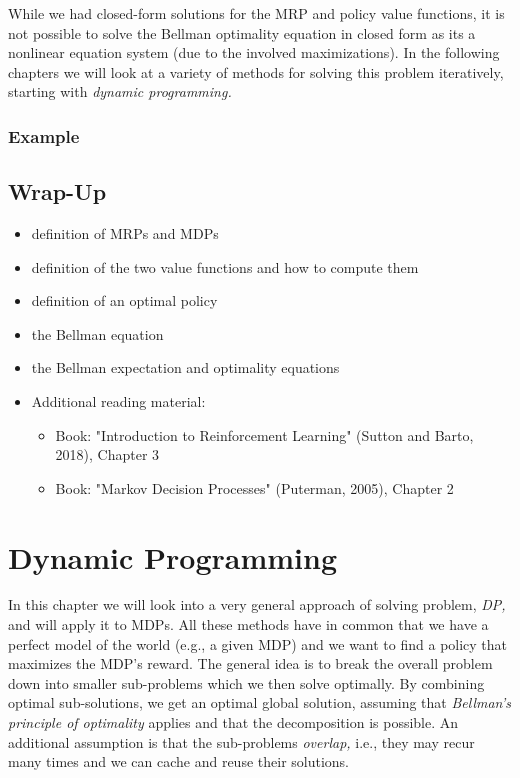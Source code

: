 				While we had closed-form solutions for the \ac{MRP} and policy value functions, it is not possible to solve the Bellman optimality equation in closed form as its a nonlinear equation system (due to the involved maximizations). In the following chapters we will look at a variety of methods for solving this problem iteratively, starting with \emph{dynamic programming.}

		\subsection{Example}

	\section{Wrap-Up}
		\begin{itemize}
			\item definition of \aclp{MRP} and \aclp{MDP}
			\item definition of the two value functions and how to compute them
			\item definition of an optimal policy
			\item the Bellman equation
			\item the Bellman expectation and optimality equations
			\item Additional reading material:
				\begin{itemize}
					\item Book: "Introduction to Reinforcement Learning" (Sutton and Barto, 2018), Chapter 3  %
					\item Book: "Markov Decision Processes" (Puterman, 2005), Chapter 2
				\end{itemize}
		\end{itemize}

\chapter{Dynamic Programming}
	\label{c:dp}

	In this chapter we will look into a very general approach of solving problem, \emph{\ac{DP},} and will apply it to \acp{MDP}. All these methods have in common that we have a perfect model of the world (e.g., a given \ac{MDP}) and we want to find a policy that maximizes the \ac{MDP}'s reward. The general idea is to break the overall problem down into smaller sub-problems which we then solve optimally. By combining optimal sub-solutions, we get an optimal global solution, assuming that \emph{Bellman's principle of optimality} applies and that the decomposition is possible. An additional assumption is that the sub-problems \emph{overlap,} i.e., they may recur many times and we can cache and reuse their solutions.

